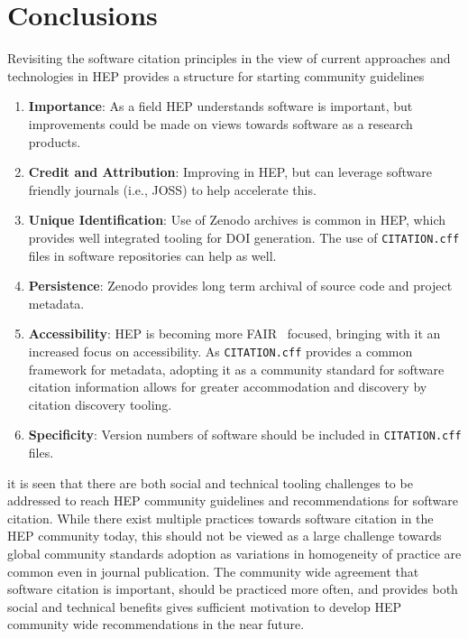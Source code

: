 \section{Conclusions}\label{sec:conclusions}

Revisiting the software citation principles in the view of current approaches and technologies in HEP provides a structure for starting community guidelines

\begin{enumerate}
    \item \textbf{Importance}: As a field HEP understands software is important, but improvements could be made on views towards software as a research products.
    \item \textbf{Credit and Attribution}: Improving in HEP, but can leverage software friendly journals (i.e., JOSS) to help accelerate this.
    \item \textbf{Unique Identification}: Use of Zenodo archives is common in HEP, which provides well integrated tooling for DOI generation.
The use of \texttt{CITATION.cff} files in software repositories can help as well.
    \item \textbf{Persistence}: Zenodo provides long term archival of source code and project metadata.
    \item \textbf{Accessibility}: HEP is becoming more FAIR~\cite{wilkinson_fair_2016,chue_hong_neil_p_2022_6623556} focused, bringing with it an increased focus on accessibility.
As \texttt{CITATION.cff} provides a common framework for metadata, adopting it as a community standard for software citation information allows for greater accommodation and discovery by citation discovery tooling.
    \item \textbf{Specificity}: Version numbers of software should be included in \texttt{CITATION.cff} files.
\end{enumerate}

it is seen that there are both social and technical tooling challenges to be addressed to reach HEP community guidelines and recommendations for software citation.
While there exist multiple practices towards software citation in the HEP community today, this should not be viewed as a large challenge towards global community standards adoption as variations in homogeneity of practice are common even in journal publication.
The community wide agreement that software citation is important, should be practiced more often, and provides both social and technical benefits gives sufficient motivation to develop HEP community wide recommendations in the near future.
